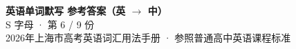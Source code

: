 \documentclass[10pt,a4paper]{article}
\begin{document}
\pagestyle{plain}

\begin{center}
{\LARGE\bfseries 英语单词默写 \quad 参考答案（英 $\to$ 中）}\\[0.22em]
{\large S 字母 · 第 6 / 9 份}\\[0.18em]
{\small 2026年上海市高考英语词汇用法手册 · 参照普通高中英语课程标准}
\end{center}

\vspace{0.2em}
\noindent{\color{rulegray}\rule{\textwidth}{0.8pt}}

\vspace{0.35em}

\vspace{0.25em}
\renewcommand{\arraystretch}{1.32}
\end{document}
